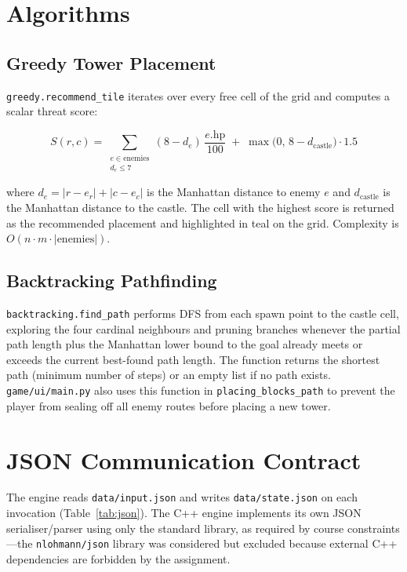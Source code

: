 \documentclass[12pt,a4paper]{report}
\begin{document}
\section{Algorithms}

\subsection{Greedy Tower Placement}

\texttt{greedy.recommend\_tile} iterates over every free cell of the grid and
computes a scalar threat score:

\[
  S(r,c) = \sum_{\substack{e \in \text{enemies} \\ d_e \le 7}}
             (8 - d_e)\,\frac{e.\text{hp}}{100}
           \;+\; \max\!\bigl(0,\,8 - d_\text{castle}\bigr) \cdot 1.5
\]

where $d_e = |r - e_r| + |c - e_c|$ is the Manhattan distance to enemy $e$
and $d_\text{castle}$ is the Manhattan distance to the castle.
The cell with the highest score is returned as the recommended placement and
highlighted in teal on the grid.
Complexity is $O(n \cdot m \cdot |\text{enemies}|)$.

\subsection{Backtracking Pathfinding}

\texttt{backtracking.find\_path} performs DFS from each spawn point to the
castle cell, exploring the four cardinal neighbours and pruning branches
whenever the partial path length plus the Manhattan lower bound to the goal
already meets or exceeds the current best-found path length.
The function returns the shortest path (minimum number of steps) or an
empty list if no path exists.
\texttt{game/ui/main.py} also uses this function in
\texttt{placing\_blocks\_path} to prevent the player from sealing off all
enemy routes before placing a new tower.

\section{JSON Communication Contract}

The engine reads \texttt{data/input.json} and writes \texttt{data/state.json}
on each invocation (Table~\ref{tab:json}).
The C++ engine implements its own JSON serialiser/parser using only the
standard library, as required by course constraints---the
\texttt{nlohmann/json} library \cite{nlohmann2024json} was considered but
excluded because external C++ dependencies are forbidden by the assignment.
\end{document}
